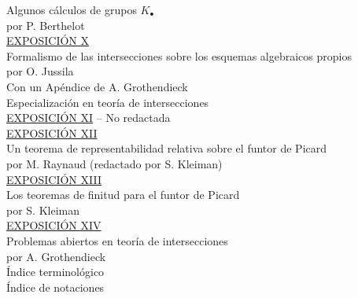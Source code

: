 \documentclass[11pt]{article}
\begin{document}
Algunos cálculos de grupos $K_\bullet$\\
por P. Berthelot \\[8pt]
\underline{EXPOSICIÓN X}\\
Formalismo de las intersecciones sobre los esquemas algebraicos propios\\
por O. Jussila\\
Con un Apéndice de A. Grothendieck\\
Especialización en teoría de intersecciones \\[8pt]
\underline{EXPOSICIÓN XI} -- No redactada\\[8pt]
\underline{EXPOSICIÓN XII}\\
Un teorema de representabilidad relativa sobre el funtor de Picard\\
por M. Raynaud (redactado por S. Kleiman) \\[8pt]
\underline{EXPOSICIÓN XIII}\\
Los teoremas de finitud para el funtor de Picard\\
por S. Kleiman \\[8pt]
\underline{EXPOSICIÓN XIV}\\
Problemas abiertos en teoría de intersecciones\\
por A. Grothendieck \\[8pt]
Índice terminológico \\[4pt]
Índice de notaciones \par
\end{document}

